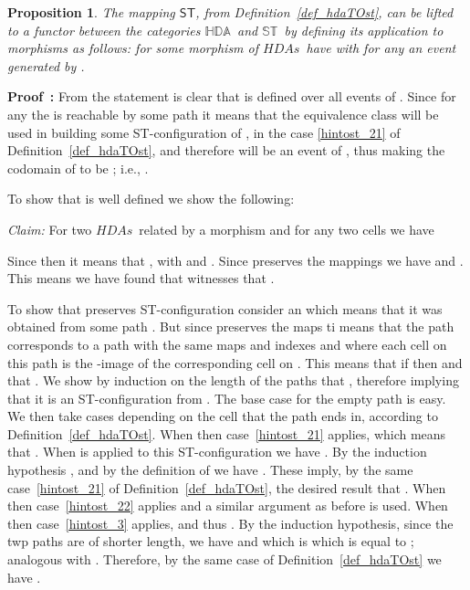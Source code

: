 \documentclass[submission,copyright,creativecommons]{eptcs}
\newtheorem{proposition}[theorem]{Proposition}
\newenvironment{proof}[1][\!\!\,]{\vspace{1ex}\noindent\textbf{Proof #1: }}{\hfill\vspace{2ex}}
\newcounter{case}
\newcommand\HDAs{\ensuremath{\mathit{HDAs}}}
\newcommand\allST{\ensuremath{\mathbb{ST}}}
\newcommand\allHDA{\ensuremath{\mathbb{HDA}}}
\newcommand\hintost{\ensuremath{\mathsf{ST}}}
\newcommand\categoryST{\ensuremath{\allST}}
\newcommand\categoryHDA{\ensuremath{\allHDA}}
\begin{document}
\begin{proposition}
The mapping \hintost, from Definition~\ref{def_hdaTOst}, can be lifted to a functor between the categories \categoryHDA\ and \categoryST\ by defining its application to morphisms as follows: for some morphism of \HDAs\  have  with  for any  an event generated by .
\end{proposition}

\begin{proof}
From the statement is clear that  is defined over all events of . Since for any  the  is reachable by some path  it means that the equivalence class  will be used in building some ST-configuration of , in the case \ref{hintost_21} of Definition~\ref{def_hdaTOst}, and therefore  will be an event of , thus making the codomain of  to be ; i.e., .

To show that  is well defined we show the following:

\vspace{1ex}
\noindent\textit{Claim:}\hspace{1ex} For two \HDAs\ related by a morphism  and for any two cells  we have 

\vspace{0.5ex}
Since  then it means that , with  and . Since  preserves the mappings we have  and . This means we have found  that witnesses that .

To show that  preserves ST-configuration consider an  which means that it was obtained from some path . But since  preserves the maps ti means that the path  corresponds to a path  with the same maps and indexes and where each cell on this path is the -image of the corresponding cell on . This means that if  then  and that . We show by induction on the length of the paths that , therefore implying that it is an ST-configuration from . The base case for the empty path is easy. We then take cases depending on the cell that the path ends in, according to Definition~\ref{def_hdaTOst}.
When  then case~\ref{hintost_21} applies, which means that . When  is applied to this ST-configuration we have . By the induction hypothesis , and by the definition of  we have . These imply, by the same case~\ref{hintost_21} of Definition~\ref{def_hdaTOst}, the desired result that .
When  then case~\ref{hintost_22} applies and a similar argument as before is used.
When  then case~\ref{hintost_3} applies, and thus . By the induction hypothesis, since the twp paths are of shorter length, we have  and  which is  which is equal to ; analogous  with . Therefore, by the same case of Definition~\ref{def_hdaTOst} we have .


\end{proof}
\end{document}
